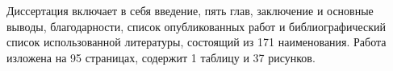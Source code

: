 Диссертация включает в себя введение, пять глав, заключение и основные выводы, благодарности, список опубликованных работ и библиографический список использованной литературы, состоящий из 171 наименования.
Работа изложена на 95 страницах, содержит 1 таблицу и 37 рисунков.